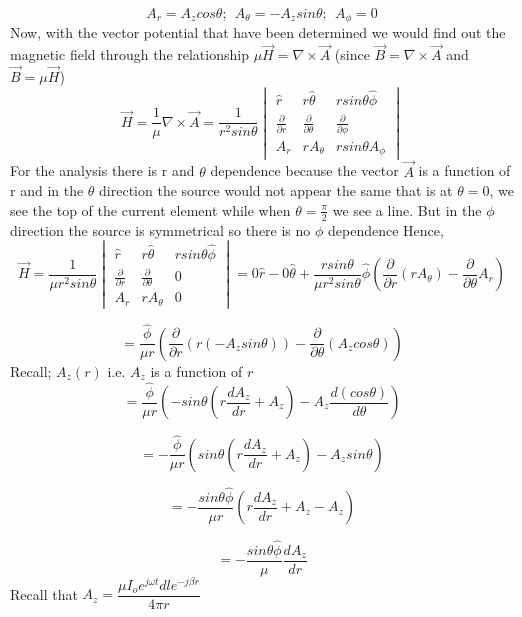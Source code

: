 $$ A_{r} = A_z cos\theta; \ \
A_{\theta} = - A_z sin\theta; \ \
A_{\phi} = 0 $$
Now, with the vector potential that have been determined we would find out the magnetic field through the relationship $\mu \vec{H} = \nabla \times \vec{A}$ (since $\vec{B} = \nabla \times \vec{A}$ and $ \vec{B} = \mu \vec{H}$)
\begin{equation*}
\vec{H} = \frac{1}{\mu} \nabla \times \vec{A} = \dfrac{1}{r^2 sin\theta}
\begin{vmatrix}
\hat{r} & r\hat{\theta} & rsin\theta\hat{\phi} \\
\frac{\partial }{\partial r} &  \frac{\partial }{\partial \theta} &  \frac{\partial }{\partial \phi} \\
A_r & rA_{\theta} & rsin\theta A_{\phi}
\end{vmatrix}
\end{equation*}
For the analysis there is r and $\theta$ dependence because the vector $\vec{A}$ is a function of r and in the $\theta$ direction the source would not appear the same that is at $\theta = 0$, we see the top of the current element while when $\theta = \frac{\pi}{2}$ we see a line. But in the $\phi$ direction the source is symmetrical so there is no $\phi$ dependence 
Hence, 
\begin{dmath*}
\vec {H} = \dfrac{1}{\mu r^2 sin\theta} \begin{vmatrix}
\hat{r} & r\hat{\theta} & rsin\theta\hat{\phi} \\
\frac{\partial }{\partial r} &  \frac{\partial }{\partial \theta} &  0 \\
A_r & rA_{\theta} & 0
\end{vmatrix} = 0 \hat{r} - 0\hat{\theta} + \dfrac{rsin\theta}{\mu r^2 sin\theta}\hat{\phi}\left( \dfrac{\partial }{\partial r}(rA_{\theta}) - \dfrac{\partial }{\partial \theta} A_r\right)
\end{dmath*}

$$ = \dfrac{\hat{\phi}}{\mu r}\left(\dfrac{\partial}{\partial r}(r(-A_z sin\theta)) - \dfrac{\partial}{\partial \theta}(A_z cos\theta)\right)$$ 
Recall; $A_z(r)$ i.e. $A_z$ is a function of $r$
$$ = \dfrac{\hat{\phi}}{\mu r} \left(-sin\theta\left(r\dfrac{dA_z}{dr} + A_z\right) - A_z \dfrac{d(cos\theta)}{d\theta}\right)$$

$$ = -\dfrac{\hat{\phi}}{\mu r} (sin\theta\left(r\dfrac{dA_z}{dr} + A_z\right) - A_zsin\theta)$$

$$ = -\dfrac{sin\theta\hat{\phi}}{\mu r} \left(r\dfrac{dA_z}{dr} + A_z - A_z\right)$$

$$ = -\dfrac{sin\theta\hat{\phi}}{\mu } \dfrac{dA_z}{dr}$$ 
Recall that $A_z = \dfrac{\mu I_o e^{j\omega t} dl e^{-j\beta r}}{4\pi r}$

